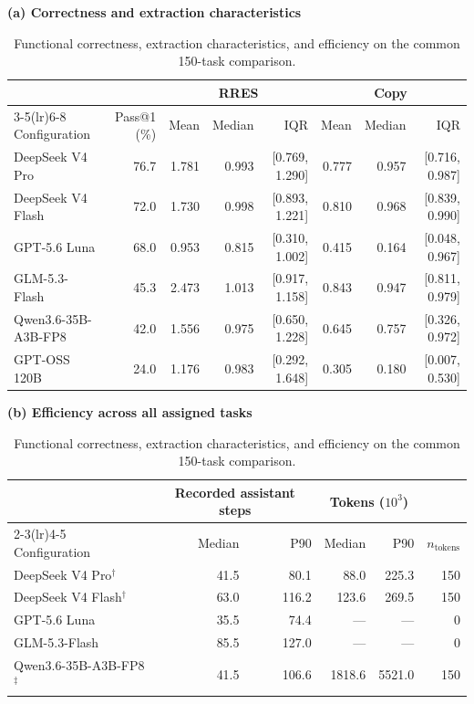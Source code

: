 \documentclass[acmsmall,screen,review,anonymous,nonacm]{acmart}
\begin{document}
\begin{table}[tbp]
 \caption{Functional correctness, extraction characteristics, and efficiency on the common 150-task comparison.}
 \label{tab:main}
 \centering\footnotesize
 \setlength{\tabcolsep}{3pt}
 \renewcommand{\arraystretch}{1.12}
 \textbf{(a) Correctness and extraction characteristics}\par\smallskip
 \begin{tabularx}{\linewidth}{@{}Xr rrr rrr@{}}
 \toprule
 & & \multicolumn{3}{c}{RRES} & \multicolumn{3}{c}{Copy} \\
 \cmidrule(lr){3-5}\cmidrule(lr){6-8}
 Configuration & Pass@1 (\%) & Mean & Median & IQR & Mean & Median & IQR \\
 \midrule
 DeepSeek V4 Pro & 76.7 & 1.781 & 0.993 & [0.769, 1.290] & 0.777 & 0.957 & [0.716, 0.987] \\
 DeepSeek V4 Flash & 72.0 & 1.730 & 0.998 & [0.893, 1.221] & 0.810 & 0.968 & [0.839, 0.990] \\
 GPT-5.6 Luna & 68.0 & 0.953 & 0.815 & [0.310, 1.002] & 0.415 & 0.164 & [0.048, 0.967] \\
 GLM-5.3-Flash & 45.3 & 2.473 & 1.013 & [0.917, 1.158] & 0.843 & 0.947 & [0.811, 0.979] \\
 Qwen3.6-35B-A3B-FP8 & 42.0 & 1.556 & 0.975 & [0.650, 1.228] & 0.645 & 0.757 & [0.326, 0.972] \\
 GPT-OSS 120B & 24.0 & 1.176 & 0.983 & [0.292, 1.648] & 0.305 & 0.180 & [0.007, 0.530] \\
 \bottomrule
 \end{tabularx}
 \par\medskip
 \textbf{(b) Efficiency across all assigned tasks}\par\smallskip
 \begin{tabularx}{\linewidth}{@{}Xrrrrr@{}}
 \toprule
 & \multicolumn{2}{c}{Recorded assistant steps} & \multicolumn{2}{c}{Tokens ($10^3$)} & \\
 \cmidrule(lr){2-3}\cmidrule(lr){4-5}
 Configuration & Median & P90 & Median & P90 & $n_{\mathrm{tokens}}$ \\
 \midrule
 DeepSeek V4 Pro$^{\dagger}$ & 41.5 & 80.1 & 88.0 & 225.3 & 150 \\
 DeepSeek V4 Flash$^{\dagger}$ & 63.0 & 116.2 & 123.6 & 269.5 & 150 \\
 GPT-5.6 Luna & 35.5 & 74.4 & --- & --- & 0 \\
 GLM-5.3-Flash & 85.5 & 127.0 & --- & --- & 0 \\
 Qwen3.6-35B-A3B-FP8$^{\ddagger}$ & 41.5 & 106.6 & 1818.6 & 5521.0 & 150 \\

\end{tabularx}
\end{table}
\end{document}
